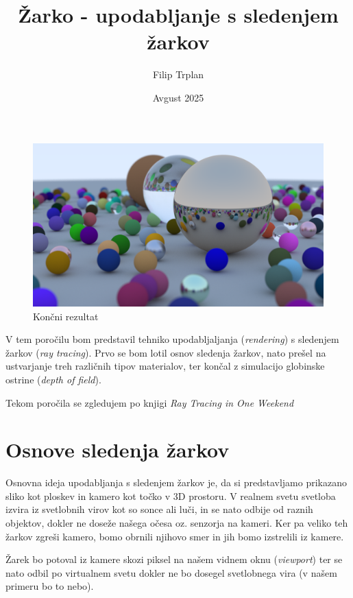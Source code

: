 \documentclass[12pt, a4paper]{article}
\title{Žarko - upodabljanje s sledenjem žarkov}
\author{Filip Trplan}
\date{Avgust 2025}
\begin{document}
\maketitle

\begin{figure}[h]
	\centering
	\includegraphics[width=\textwidth]{cover}
	\caption{Končni rezultat}
\end{figure}

V tem poročilu bom predstavil tehniko upodabljaljanja (\textit{rendering}) s sledenjem žarkov
(\textit{ray tracing}). Prvo se bom lotil osnov sledenja žarkov, nato prešel na ustvarjanje treh
različnih tipov materialov, ter končal z simulacijo globinske ostrine (\textit{depth of field}).

Tekom poročila se zgledujem po knjigi \textit{Ray Tracing in One Weekend} \cite{Shirley2025RTW1}

\section{Osnove sledenja žarkov}

Osnovna ideja upodabljanja s sledenjem žarkov je, da si predstavljamo prikazano sliko kot ploskev in kamero
kot točko v 3D prostoru. V realnem svetu svetloba izvira iz svetlobnih virov kot so sonce ali luči,
in se nato odbije od raznih objektov, dokler ne doseže našega očesa oz. senzorja na kameri.
Ker pa veliko teh žarkov zgreši kamero, bomo obrnili njihovo smer in jih bomo izstrelili iz kamere.

Žarek bo potoval iz kamere skozi piksel na našem vidnem oknu (\textit{viewport}) ter se nato odbil po
virtualnem svetu dokler ne bo dosegel svetlobnega vira (v našem primeru bo to nebo).
\end{document}
